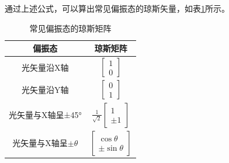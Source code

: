 \documentclass[type=master,oneside]{fduthesis}
\begin{document}
通过上述公式，可以算出常见偏振态的琼斯矢量，如表\ref{tab:常见偏振态的琼斯矩阵}所示。
\begin{table}[H]
  \centering
  \caption{常见偏振态的琼斯矩阵}
  \label{tab:常见偏振态的琼斯矩阵}
  \begin{tabular}{cc}
    \hline
    偏振态                     & 琼斯矩阵                                                        \\ \hline
    光矢量沿X轴                & $\left[\begin{array}{c}1 \\ 0\end{array}\right]$                   \\ \hline
    光矢量沿Y轴                & $\left[\begin{array}{c}0 \\ 1\end{array}\right]$                   \\ \hline
    光矢量与X轴呈±45°          & $\frac{1}{\sqrt{2}}\left[\begin{array}{c}1 \\ \pm 1\end{array}\right]$ \\ \hline
    光矢量与X轴呈$\pm \theta $ & $\left[\begin{array}{c}\cos \theta \\ \pm \sin \theta\end{array}\right]$                   \\ \hline
  \end{tabular}
\end{table}
\end{document}

